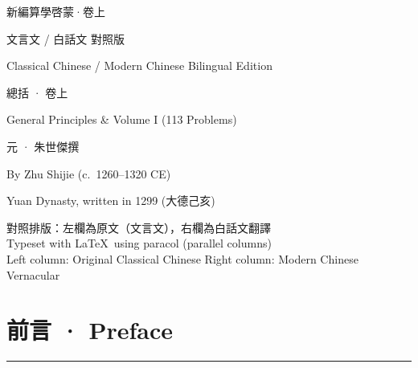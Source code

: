 \documentclass[11pt,a4paper]{article}
\newcommand{\longline}{\noindent\rule{\textwidth}{0.4pt}}
\begin{document}
\begin{titlepage}
\begin{center}
\vspace*{2cm}

{\fontsize{24}{32}\selectfont\color{titlecolor}
  新編\!算學\!啓蒙\!·\!卷上}

\vspace{0.5cm}

{\fontsize{16}{22}\selectfont\color{sectioncolor}
  文言文 / 白話文 對照版}

\vspace{1.5cm}

{\Large\color{sectioncolor}
  Classical Chinese / Modern Chinese Bilingual Edition}

\vspace{2.5cm}

{\LARGE\color{titlecolor} 總括 · 卷上}

\vspace{0.5cm}

{\large General Principles \& Volume I (113 Problems)}

\vspace{2.5cm}

{\large 元 · 朱世傑撰}

\vspace{0.3cm}

{\normalsize\color{sectioncolor}
  By Zhu Shijie (c.\ 1260--1320 CE)}

\vspace{0.2cm}

{\small\color{sectioncolor}
  Yuan Dynasty, written in 1299 (大德己亥)}

\vspace{2cm}

{\small\color{notecolor}
  對照排版：左欄為原文（文言文），右欄為白話文翻譯\\
  Typeset with \LaTeX\ using paracol (parallel columns)\\
  Left column: Original Classical Chinese \quad Right column: Modern Chinese Vernacular}

\end{center}
\end{titlepage}

\tableofcontents
\newpage

\section*{前言 · Preface}
\longline
\end{document}
